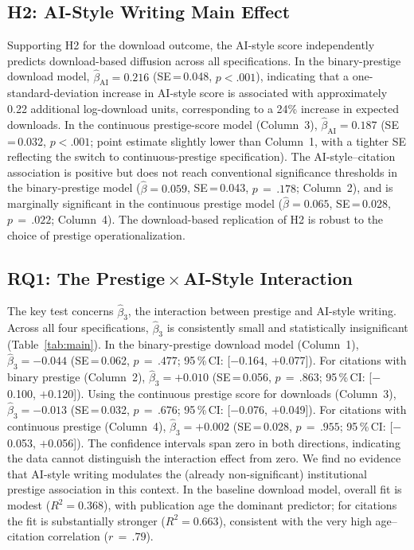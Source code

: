 \documentclass[12pt,a4paper]{article}
\begin{document}
\subsection{H2: AI-Style Writing Main Effect}

Supporting H2 for the download outcome, the AI-style score independently
predicts download-based diffusion across all specifications.
In the binary-prestige download model,
$\hat{\beta}_{\text{AI}} = 0.216$ (SE\,=\,0.048, $p<.001$),
indicating that a one-standard-deviation increase in AI-style score
is associated with approximately 0.22 additional log-download units,
corresponding to a 24\% increase in expected downloads.
In the continuous prestige-score model (Column~3),
$\hat{\beta}_{\text{AI}} = 0.187$ (SE\,=\,0.032, $p<.001$;
point estimate slightly lower than Column~1, with a tighter SE
reflecting the switch to continuous-prestige specification).
The AI-style--citation association is positive but does not reach
conventional significance thresholds in the binary-prestige model
($\hat{\beta} = 0.059$, SE\,=\,0.043, $p\,=\,.178$; Column~2),
and is marginally significant in the continuous prestige model
($\hat{\beta} = 0.065$, SE\,=\,0.028, $p\,=\,.022$; Column~4).
The download-based replication of H2 is robust to the choice of
prestige operationalization.

\subsection{RQ1: The Prestige\,$\times$\,AI-Style Interaction}

The key test concerns $\hat{\beta}_3$, the interaction between prestige
and AI-style writing.
Across all four specifications, $\hat{\beta}_3$ is consistently small
and statistically insignificant (Table~\ref{tab:main}).
In the binary-prestige download model (Column~1),
$\hat{\beta}_3 = -0.044$ (SE\,=\,0.062, $p\,=\,.477$;
95\,\%\,CI: [$-$0.164, $+$0.077]).
For citations with binary prestige (Column~2),
$\hat{\beta}_3 = +0.010$ (SE\,=\,0.056, $p\,=\,.863$;
95\,\%\,CI: [$-$0.100, $+$0.120]).
Using the continuous prestige score for downloads (Column~3),
$\hat{\beta}_3 = -0.013$ (SE\,=\,0.032, $p\,=\,.676$;
95\,\%\,CI: [$-$0.076, $+$0.049]).
For citations with continuous prestige (Column~4),
$\hat{\beta}_3 = +0.002$ (SE\,=\,0.028, $p\,=\,.955$;
95\,\%\,CI: [$-$0.053, $+$0.056]).
The confidence intervals span zero in both directions,
indicating the data cannot distinguish the interaction effect from zero.
We find no evidence that AI-style writing modulates the (already
non-significant) institutional prestige association in this context.
In the baseline download model, overall fit is modest ($R^2 = 0.368$),
with publication age the dominant predictor; for citations the fit is
substantially stronger ($R^2 = 0.663$), consistent with the very high
age--citation correlation ($r\,=\,.79$).
\end{document}
